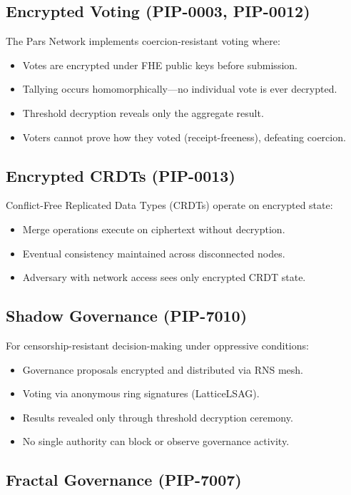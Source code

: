 \documentclass[11pt,letterpaper]{article}
\begin{document}
\subsection{Encrypted Voting (PIP-0003, PIP-0012)}

The Pars Network implements coercion-resistant voting where:
\begin{itemize}
\item Votes are encrypted under FHE public keys before submission.
\item Tallying occurs homomorphically---no individual vote is ever decrypted.
\item Threshold decryption reveals only the aggregate result.
\item Voters cannot prove how they voted (receipt-freeness), defeating coercion.
\end{itemize}

\subsection{Encrypted CRDTs (PIP-0013)}

Conflict-Free Replicated Data Types (CRDTs) operate on encrypted state:
\begin{itemize}
\item Merge operations execute on ciphertext without decryption.
\item Eventual consistency maintained across disconnected nodes.
\item Adversary with network access sees only encrypted CRDT state.
\end{itemize}

\subsection{Shadow Governance (PIP-7010)}

For censorship-resistant decision-making under oppressive conditions:
\begin{itemize}
\item Governance proposals encrypted and distributed via RNS mesh.
\item Voting via anonymous ring signatures (LatticeLSAG).
\item Results revealed only through threshold decryption ceremony.
\item No single authority can block or observe governance activity.
\end{itemize}

\subsection{Fractal Governance (PIP-7007)}
\end{document}
